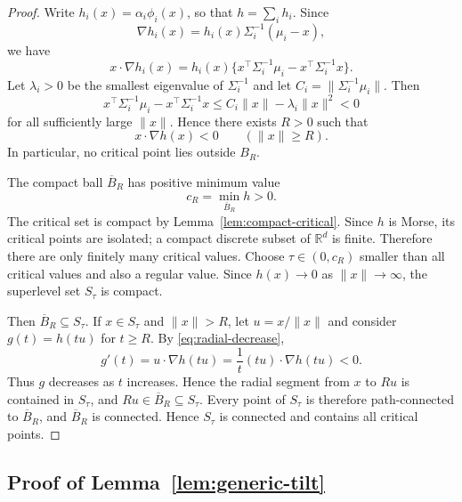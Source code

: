 \documentclass[11pt]{article}
\theoremstyle{plain}
\theoremstyle{definition}
\theoremstyle{remark}
\numberwithin{equation}{section}
\newcommand{\R}{\mathbb{R}}
\begin{document}
\begin{proof}
Write $h_i(x)=\alpha_i\phi_i(x)$, so that $h=\sum_i h_i$. Since
\[
\nabla h_i(x)=h_i(x)\Sigma_i^{-1}(\mu_i-x),
\]
we have
\[
x\cdot\nabla h_i(x)=h_i(x)\{x^\top\Sigma_i^{-1}\mu_i-x^\top\Sigma_i^{-1}x\}.
\]
Let $\lambda_i>0$ be the smallest eigenvalue of $\Sigma_i^{-1}$ and let $C_i=\|\Sigma_i^{-1}\mu_i\|$. Then
\[
x^\top\Sigma_i^{-1}\mu_i-x^\top\Sigma_i^{-1}x
\le C_i\|x\|-\lambda_i\|x\|^2<0
\]
for all sufficiently large $\|x\|$. Hence there exists $R>0$ such that
\begin{equation}\label{eq:radial-decrease}
x\cdot\nabla h(x)<0
\qquad (\|x\|\ge R).
\end{equation}
In particular, no critical point lies outside $B_R$.

The compact ball $\overline B_R$ has positive minimum value
\[
c_R=\min_{\overline B_R}h>0.
\]
The critical set is compact by Lemma~\ref{lem:compact-critical}. Since $h$ is Morse, its critical points are isolated; a compact discrete subset of $\R^d$ is finite. Therefore there are only finitely many critical values. Choose $\tau\in(0,c_R)$ smaller than all critical values and also a regular value. Since $h(x)\to0$ as $\|x\|\to\infty$, the superlevel set $S_\tau$ is compact.

Then $\overline B_R\subseteq S_\tau$. If $x\in S_\tau$ and $\|x\|>R$, let $u=x/\|x\|$ and consider $g(t)=h(tu)$ for $t\ge R$. By \eqref{eq:radial-decrease},
\[
g'(t)=u\cdot \nabla h(tu)=\frac{1}{t}(tu)\cdot\nabla h(tu)<0.
\]
Thus $g$ decreases as $t$ increases. Hence the radial segment from $x$ to $Ru$ is contained in $S_\tau$, and $Ru\in \overline B_R\subseteq S_\tau$. Every point of $S_\tau$ is therefore path-connected to $\overline B_R$, and $\overline B_R$ is connected. Hence $S_\tau$ is connected and contains all critical points.
\end{proof}

\subsection{Proof of Lemma~\ref{lem:generic-tilt}}\label{subsec:generic-tilt-proof}
\end{document}
